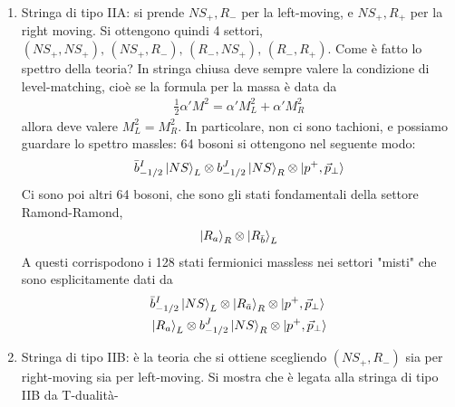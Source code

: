 \documentclass{report}
\begin{document}
\begin{enumerate}
    \item Stringa di tipo IIA: si prende \(NS_+, R_-\) per la left-moving, e \(NS_+, R_+\) per la right moving. Si ottengono quindi 4 settori, \((NS_+, NS_+), \, (NS_+, R_-), \, (R_-, NS_+), \, (R_-, R_+)\). Come è fatto lo spettro della teoria? In stringa chiusa deve sempre valere la condizione di level-matching, cioè se la formula per la massa è data da 
    \begin{align}
        \frac{1}{2}\alpha'M^2 = \alpha' M^2_L + \alpha' M^2_R
    \end{align}
    allora deve valere \(M^2_L = M^2_R\). In particolare, non ci sono tachioni, e possiamo guardare lo spettro massles: 64 bosoni si ottengono nel seguente modo: 
    \begin{align}
        \bar{b}_{-1/2}^I \ket{NS}_L \otimes b ^J_{-1/2}\ket{NS}_R \otimes \ket{p^+, \vec{p}_\perp}
    \end{align}
    Ci sono poi altri 64 bosoni, che sono gli stati fondamentali della settore Ramond-Ramond, 
    \begin{align}
        \ket{R_a}_R \otimes \ket{R_{\bar{b}}}_L
    \end{align}
    A questi corrispodono i 128 stati fermionici massless nei settori "misti" che sono esplicitamente dati da
    \begin{align}
        &\bar{b}_{-1/2}^I \ket{NS}_L \otimes \ket{R_{\bar{a}}}_R \otimes \ket{p^+, \vec{p}_\perp} \notag \\
        &\ket{R_a}_L \otimes b ^J_{-1/2}\ket{NS}_R \otimes \ket{p^+, \vec{p}_\perp}
    \end{align}
    \item Stringa di tipo IIB: è la teoria che si ottiene scegliendo \((NS_+, R_-)\) sia per right-moving sia per left-moving. Si mostra che è legata alla stringa di tipo IIB da T-dualità- 
\end{enumerate}
\end{document}
